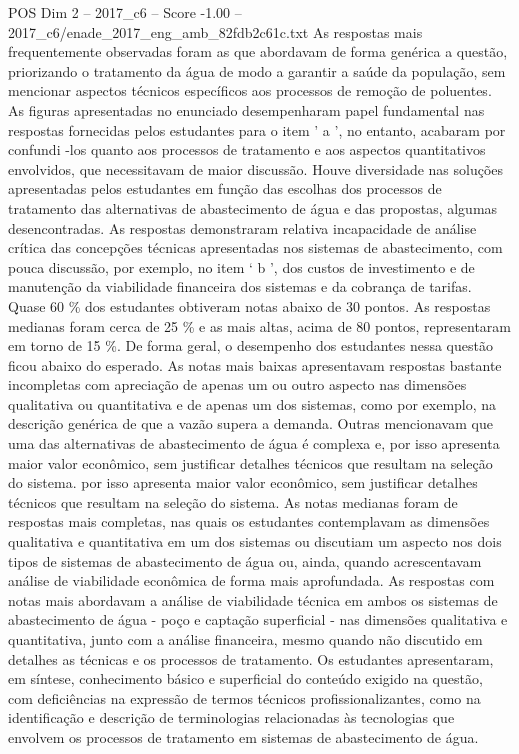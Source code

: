 \begin{textsample}{POS Dim 2 – 2017\_c6 – Score -1.00 – 2017\_c6/enade\_2017\_eng\_amb\_82fdb2c61c.txt}
As respostas mais frequentemente observadas foram as que abordavam de forma genérica a questão, priorizando o tratamento da água de modo a garantir a saúde da população, sem mencionar aspectos técnicos específicos aos processos de remoção de poluentes.
As figuras apresentadas no enunciado desempenharam papel fundamental nas respostas fornecidas pelos estudantes para o item ' a ', no entanto, acabaram por confundi -los quanto aos processos de tratamento e aos aspectos quantitativos envolvidos, que necessitavam de maior discussão.
Houve diversidade nas soluções apresentadas pelos estudantes em função das escolhas dos processos de tratamento das alternativas de abastecimento de água e das propostas, algumas desencontradas.
As respostas demonstraram relativa incapacidade de análise crítica das concepções técnicas apresentadas nos sistemas de abastecimento, com pouca discussão, por exemplo, no item ‘ b ’, dos custos de investimento e de manutenção da viabilidade financeira dos sistemas e da cobrança de tarifas.
Quase 60 \% dos estudantes obtiveram notas abaixo de 30 pontos.
As respostas medianas foram cerca de 25 \% e as mais altas, acima de 80 pontos, representaram em torno de 15 \%.
De forma geral, o desempenho dos estudantes nessa questão ficou abaixo do esperado.
As notas mais baixas apresentavam respostas bastante incompletas com apreciação de apenas um ou outro aspecto nas dimensões qualitativa ou quantitativa e de apenas um dos sistemas, como por exemplo, na descrição genérica de que a vazão supera a demanda.
Outras mencionavam que uma das alternativas de abastecimento de água é complexa e, por isso apresenta maior valor econômico, sem justificar detalhes técnicos que resultam na seleção do sistema. por isso apresenta maior valor econômico, sem justificar detalhes técnicos que resultam na seleção do sistema.
As notas medianas foram de respostas mais completas, nas quais os estudantes contemplavam as dimensões qualitativa e quantitativa em um dos sistemas ou discutiam um aspecto nos dois tipos de sistemas de abastecimento de água ou, ainda, quando acrescentavam análise de viabilidade econômica de forma mais aprofundada.
As respostas com notas mais abordavam a análise de viabilidade técnica em ambos os sistemas de abastecimento de água - poço e captação superficial - nas dimensões qualitativa e quantitativa, junto com a análise financeira, mesmo quando não discutido em detalhes as técnicas e os processos de tratamento.
Os estudantes apresentaram, em síntese, conhecimento básico e superficial do conteúdo exigido na questão, com deficiências na expressão de termos técnicos profissionalizantes, como na identificação e descrição de terminologias relacionadas às tecnologias que envolvem os processos de tratamento em sistemas de abastecimento de água.

\end{textsample}
